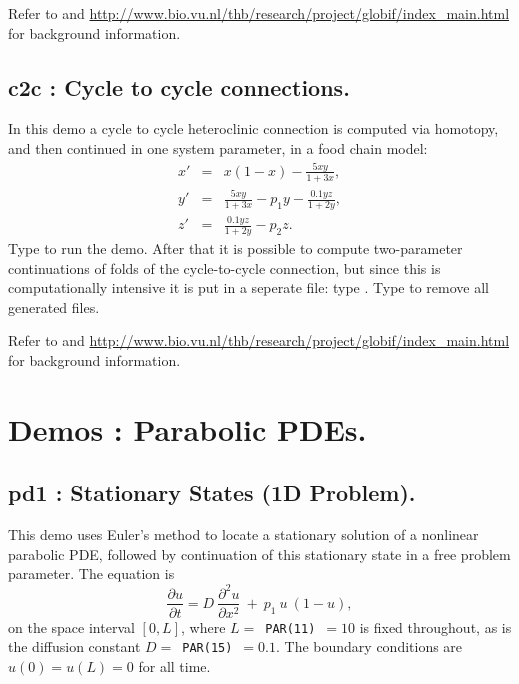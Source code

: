 \documentclass[12pt]{report}
\begin{document}
Refer to  \citeyear{DoKoVoKu08} and 
\url{http://www.bio.vu.nl/thb/research/project/globif/index_main.html}
for background information.

%
\section{ c2c : Cycle to cycle connections.} \label{sec:Demos_c2c}

In this demo a cycle to cycle heteroclinic connection is computed via
homotopy, and then continued in one system parameter, in a food chain model:
\begin{eqnarray*}
    x' &=& x(1 - x) - \frac{5 x y}{1 + 3 x}, \\
    y' &=& \frac{5 x y}{1 + 3 x}  - p_1 y - \frac{0.1 y z}{1 + 2 y}, \\
    z' &=& \frac{0.1 y z}{1 + 2 y} - p_2 z. \end{eqnarray*}
Type  to run the demo.
After that it is possible to compute two-parameter continuations of
folds of the cycle-to-cycle
connection, but since this is computationally intensive it is put in
a seperate file: type .
Type  to remove all generated files.

Refer to  \citeyear{DoKoVoKu09} and 
\url{http://www.bio.vu.nl/thb/research/project/globif/index_main.html}
for background information.
\chapter{ \AUTO Demos : Parabolic PDEs.} \label{ch:Demos_PDE}

\newpage
\section{ pd1 : Stationary States (1D Problem).} \label{sec:Demos_pd1}
This demo uses Euler's method to locate a stationary solution of
a nonlinear parabolic PDE, followed by continuation of this stationary
state in a free problem parameter. The equation is
 $$ \frac{\partial u }{ \partial t} 
  = D~\frac{\partial^2 u }{ \partial x^2} ~+~  p_1~ u ~( 1-u) , $$
on the space interval $[0,L]$, where $L=$~{\tt PAR(11)}~$=10$ is fixed throughout,
as is the diffusion constant $D=$~{\tt PAR(15)}~$=0.1$.
The boundary conditions are $u(0) = u(L) = 0$ for all time.
\end{document}
